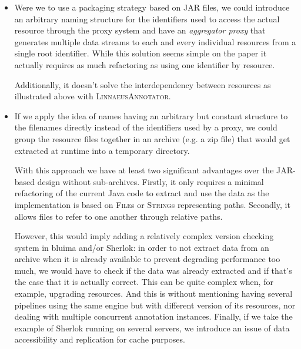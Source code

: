 \documentclass{article}
\newcommand{\ID}[1]{{\textsc{#1}}}
\newcommand{\JAR}{JAR\xspace}
\begin{document}
\begin{itemize}

    \item Were we to use a packaging strategy based on \JAR files, we could introduce an arbitrary
        naming structure for the identifiers used to access the actual resource through the proxy
        system and have an \emph{aggregator proxy} that generates multiple data streams to each and
        every individual resources from a single root identifier. While this solution seems simple
        on the paper it actually requires as much refactoring as using one identifier by resource.

        Additionally, it doesn't solve the interdependency between resources as illustrated above
        with \ID{LinnaeusAnnotator}.

    \item If we apply the idea of names having an arbitrary but constant structure to the filenames
        directly instead of the identifiers used by a proxy, we could group the resource files
        together in an archive (e.g. a zip file) that would get extracted at runtime into a
        temporary directory.

        With this approach we have at least two significant advantages over the \JAR-based design
        without sub-archives. Firstly, it only requires a minimal refactoring of the current Java
        code to extract and use the data as the implementation is based on \ID{File}s or
        \ID{String}s representing paths. Secondly, it allows files to refer to one another through
        relative paths.

        However, this would imply adding a relatively complex version checking system in bluima
        and/or Sherlok: in order to not extract data from an archive when it is already available to
        prevent degrading performance too much, we would have to check if the data was already
        extracted and if that's the case that it is actually correct. This can be quite complex
        when, for example, upgrading resources. And this is without mentioning having several
        pipelines using the same engine but with different version of its resources, nor dealing
        with multiple concurrent annotation instances. Finally, if we take the example of Sherlok
        running on several servers, we introduce an issue of data accessibility and replication for
        cache purposes.

\end{itemize}
\end{document}

